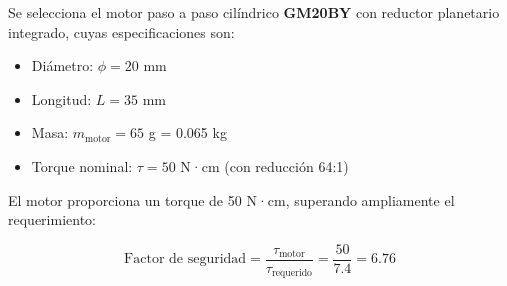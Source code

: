 Se selecciona el motor paso a paso cilíndrico \textbf{GM20BY} con reductor planetario integrado, cuyas especificaciones son:

\begin{itemize}[label=$\bullet$]
    \item Diámetro: $\phi = 20$ mm
    \item Longitud: $L = 35$ mm
    \item Masa: $m_{\text{motor}} = 65$ g = 0.065 kg
    \item Torque nominal: $\tau = 50$ N·cm (con reducción 64:1)
\end{itemize}

El motor proporciona un torque de 50 N·cm, superando ampliamente el requerimiento:

\begin{equation}
\text{Factor de seguridad} = \frac{\tau_{\text{motor}}}{\tau_{\text{requerido}}} = \frac{50}{7.4} = 6.76
\end{equation}
